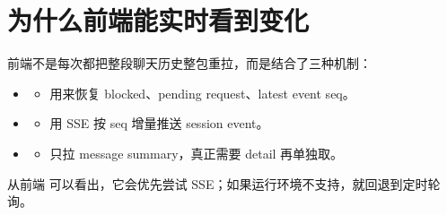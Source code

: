 \documentclass[11pt,a4paper]{ctexart}
\begin{document}
\section{为什么前端能实时看到变化}

前端不是每次都把整段聊天历史整包重拉，而是结合了三种机制：

\begin{itemize}
  \item {}
  \begin{itemize}
    \item 用来恢复 blocked、pending request、latest event seq。
  \end{itemize}
  \item {}
  \begin{itemize}
    \item 用 SSE 按 seq 增量推送 session event。
  \end{itemize}
  \item {}
  \begin{itemize}
    \item 只拉 message summary，真正需要 detail 再单独取。
  \end{itemize}
\end{itemize}

从前端  可以看出，它会优先尝试 SSE；如果运行环境不支持，就回退到定时轮询。
\end{document}

